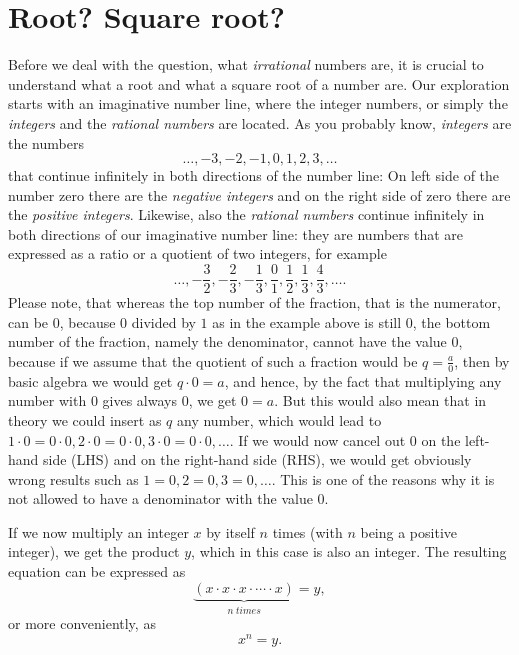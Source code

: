 \documentclass[11pt]{amsart}
\theoremstyle{definition}
\begin{document}
\section{Root? Square root?}
Before we deal with the question, what \emph{irrational} numbers are, it is crucial to understand what a root and what a square root of a number are. Our exploration starts with an imaginative number line, where the integer numbers, or simply the \emph{integers} and the \emph{rational numbers} are located.
As you probably know, \emph{integers} are the numbers 
\begin{equation*}
    \dots , -3, -2, -1, 0, 1, 2, 3, \dots
\end{equation*}
that continue infinitely in both directions of the number line: 
On left side of the number zero there are the \emph{negative integers} and on the right side of zero there are the \emph{positive integers}. 
Likewise, also the \emph{rational numbers} continue infinitely in both directions of our imaginative number line: they are numbers that are expressed as a ratio or a quotient of two integers, for example
\begin{equation*}
    \dots, -\frac{3}{2}, -\frac{2}{3}, -\frac{1}{3}, \frac{0}{1}, \frac{1}{2}, \frac{1}{3}, \frac{4}{3}, \dots .
\end{equation*}
Please note, that whereas the top number of the fraction, that is the numerator, can be \(0\), because \(0\) divided by \(1\) as in the example above is still \(0\), the bottom number of the fraction, namely the denominator, cannot have the value \(0\), because if we assume that the quotient of such a fraction would be \(q = \frac{a}{0}\), then by basic algebra we would get \(q \cdot 0 = a\), and hence, by the fact that multiplying any number with \(0\) gives always \(0\), we get \(0 = a\). But this would also mean that in theory we could insert as \(q\) any number, which would lead to \(1 \cdot 0 = 0 \cdot 0, 2 \cdot 0 = 0 \cdot 0, 3 \cdot 0 = 0 \cdot 0, \dots\). If we would now cancel out \(0\) on the left-hand side (LHS) and on the right-hand side (RHS), we would get obviously wrong results such as \(1 = 0, 2 = 0, 3 = 0, \dots\). This is one of the reasons why it is not allowed to have a denominator with the value \(0\).

If we now multiply an integer \(x\) by itself \(n\) times (with \(n\) being a positive integer), we get the product \(y\), which in this case is also an integer.
The resulting equation can be expressed as
\begin{equation}
    \underbrace{(x \cdot x \cdot x \cdot \cdots \cdot x)}_{n \; times} = y,
\end{equation}
or more conveniently, as
\begin{equation}
    x^{n} = y.
\end{equation}
\end{document}
